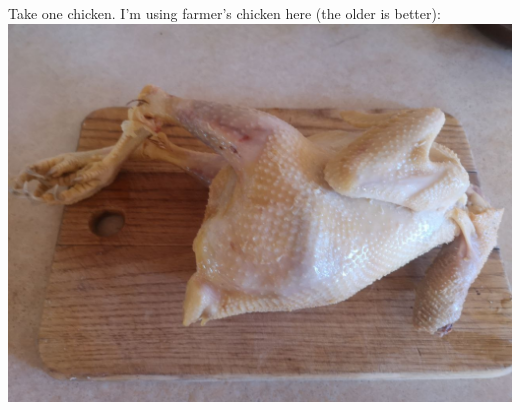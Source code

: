 \documentclass[11pt,a4paper]{article}
\begin{document}
Take one chicken. I'm using farmer's chicken here (the older is better):
\includegraphics[width=\textwidth]{1.jpg}
\label{fig:chicken}
\end{document}
